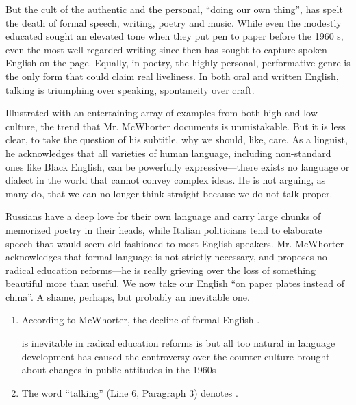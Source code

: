 {But the cult of the authentic and the personal, ``doing our own thing'',
has spelt the death of formal speech, writing, poetry and music. While
even the modestly educated sought an elevated tone when they put pen to
paper before the 1960 s, even the most well regarded writing since then
has sought to capture spoken English on the page. Equally, in poetry,
the highly personal, performative genre is the only form that could
claim real liveliness. In both oral and written English, talking is
triumphing over speaking, spontaneity over craft.

Illustrated with an entertaining array of examples from both high and
low culture, the trend that Mr. McWhorter documents is unmistakable. But
it is less clear, to take the question of his subtitle, why we should,
like, care. As a linguist, he acknowledges that all varieties of human
language, including non-standard ones like Black English, can be
powerfully expressive---there exists no language or dialect in the world
that cannot convey complex ideas. He is not arguing, as many do, that we
can no longer think straight because we do not talk proper.

Russians have a deep love for their own language and carry large chunks
of memorized poetry in their heads, while Italian politicians tend to
elaborate speech that would seem old-fashioned to most English-speakers.
Mr. McWhorter acknowledges that formal language is not strictly
necessary, and proposes no radical education reforms---he is really
grieving over the loss of something beautiful more than useful. We now
take our English ``on paper plates instead of china''. A shame, perhaps,
but probably an inevitable one.


\begin{enumerate}[resume]
	\item
According to McWhorter, the decline of formal English \lineread.


\fourchoices
{is inevitable in radical education reforms}
{is but all too natural in language development}
{has caused the controversy over the counter-culture}
{brought about changes in public attitudes in the 1960s}


\item
The word ``talking'' (Line 6, Paragraph 3) denotes \lineread.


\end{enumerate}}
